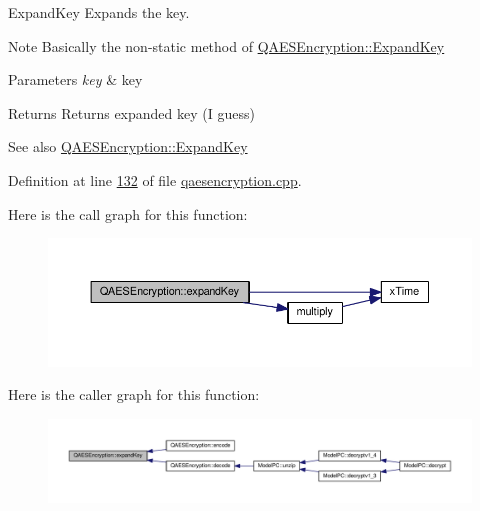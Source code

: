 Expand\+Key Expands the key. 

\begin{DoxyNote}{Note}
Basically the non-\/static method of \hyperlink{class_q_a_e_s_encryption_a2112456e057e6dd886694348fbf202cd}{Q\+A\+E\+S\+Encryption\+::\+Expand\+Key}
\end{DoxyNote}

\begin{DoxyParams}{Parameters}
{\em key} & key \\
\hline
\end{DoxyParams}
\begin{DoxyReturn}{Returns}
Returns expanded key (I guess) 
\end{DoxyReturn}
\begin{DoxySeeAlso}{See also}
\hyperlink{class_q_a_e_s_encryption_a2112456e057e6dd886694348fbf202cd}{Q\+A\+E\+S\+Encryption\+::\+Expand\+Key} 
\end{DoxySeeAlso}


Definition at line \hyperlink{qaesencryption_8cpp_source_l00132}{132} of file \hyperlink{qaesencryption_8cpp_source}{qaesencryption.\+cpp}.



Here is the call graph for this function\+:
\nopagebreak
\begin{figure}[H]
\begin{center}
\leavevmode
\includegraphics[width=350pt]{class_q_a_e_s_encryption_a5bfbb972f84a8376fceed648553c0912_cgraph}
\end{center}
\end{figure}




Here is the caller graph for this function\+:
\nopagebreak
\begin{figure}[H]
\begin{center}
\leavevmode
\includegraphics[width=350pt]{class_q_a_e_s_encryption_a5bfbb972f84a8376fceed648553c0912_icgraph}
\end{center}
\end{figure}


